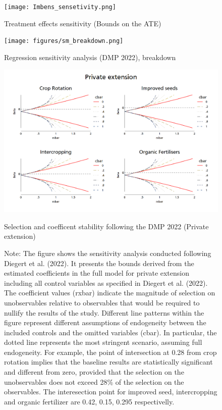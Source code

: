 \documentclass[
]{article}
\begin{document}
\pagebreak
\newpage

\newpage

\begin{figure}[htbp]
\centering
\texttt{[image: Imbens\_sensetivity.png]}
\caption{Treatment effects sensitivity (Bounds on the ATE)}
\end{figure}

\pagebreak
\newpage

\begin{figure}[htbp]
\centering
\texttt{[image: figures/sm\_breakdown.png]}
\caption{Regression sensitivity analysis (DMP 2022), breakdown}
\end{figure}

\pagebreak
\newpage

\begin{figure}[htbp]
\centering
\includegraphics[width=1\textwidth]{figures/combined_private.png}
\caption{Selection and coefficent stability following the DMP 2022 (Private extension)}
\caption*{Note: The figure shows the sensitivity analysis conducted following Diegert et al. (2022). It presents the bounds derived from the estimated coefficients in the full model for private extension including all control variables as specified in Diegert et al. (2022). The coefficient values (rxbar) indicate the magnitude of selection on unobservables relative to observables that would be required to nullify the results of the study. Different line patterns within the figure represent different assumptions of endogeneity between the included controls and the omitted variables (cbar). In particular, the dotted line represents the most stringent scenario, assuming full endogeneity. For example,  the point of intersection at 0.28 from crop rotation implies that the baseline results are statistically significant and different from zero, provided that the selection on the unobservables does not exceed 28\% of the selection on the observables. The interesection point for improved seed, intercropping and organic fertilizer are 0.42, 0.15, 0.295 respectivelly.}
\end{figure}
\end{document}
